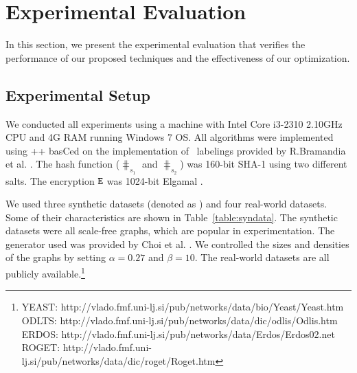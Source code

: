 \section{Experimental Evaluation}
\label{sec:exp}

In this section, we present the experimental evaluation that verifies
the performance of our proposed techniques and the effectiveness of our
optimization.

\subsection{Experimental Setup}
\label{subsec:expsetup}


 We conducted all experiments using a machine
with Intel Core i3-2310 2.10GHz CPU and 4G RAM running Windows 7 OS.  All
algorithms were implemented using ++ basCed on the implementation of \hop\
labelings provided by R.Bramandia et al. \cite{byron}. The hash function ($\hash_{s_1}$
and $\hash_{s_2}$) was  160-bit SHA-1 using two different salts. %
The encryption  ${\tt E}$ was 1024-bit Elgamal \cite{elgamal}.

\stab
{} We used three synthetic datasets (denoted as \SYN) and four
real-world datasets. Some of their characteristics are shown in
Table~\ref{table:syndata}. The synthetic datasets were all scale-free graphs,
which are popular in experimentation. The generator used was provided by Choi
et al. \cite{generator}. We controlled the sizes and densities of the graphs by
setting $\alpha = 0.27$ and $\beta = 10$.  The real-world datasets are all
publicly available.\footnote{\scriptsize
YEAST: http://vlado.fmf.uni-lj.si/pub/networks/data/bio/Yeast/Yeast.htm \\
ODLTS: http://vlado.fmf.uni-lj.si/pub/networks/data/dic/odlis/Odlis.htm \\
ERDOS: http://vlado.fmf.uni-lj.si/pub/networks/data/Erdos/Erdos02.net \\
ROGET: http://vlado.fmf.uni-lj.si/pub/networks/data/dic/roget/Roget.htm
} %


